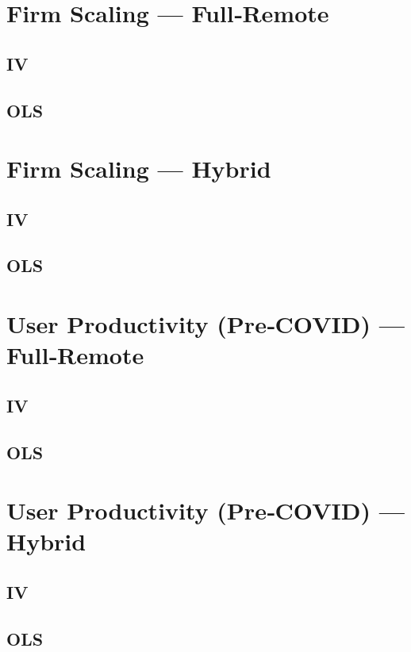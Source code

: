 \documentclass{article}
\newcommand{\cleanedresultsdir}{../../results/cleaned}
\begin{document}
\section*{Firm Scaling — Full‑Remote}
\subsection*{IV}

\subsection*{OLS}


\section*{Firm Scaling — Hybrid}
\subsection*{IV}

\subsection*{OLS}


\section*{User Productivity (Pre‑COVID) — Full‑Remote}
\subsection*{IV}

\subsection*{OLS}


\section*{User Productivity (Pre‑COVID) — Hybrid}
\subsection*{IV}

\subsection*{OLS}

\end{document}
